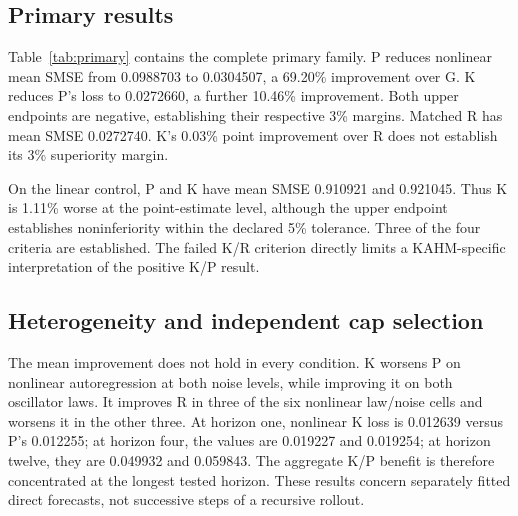 \subsection{Primary results}
Table~\ref{tab:primary} contains the complete primary family. P reduces nonlinear mean SMSE from 0.0988703 to 0.0304507, a 69.20\% improvement over G. K reduces P's loss to 0.0272660, a further 10.46\% improvement. Both upper endpoints are negative, establishing their respective 3\% margins. Matched R has mean SMSE 0.0272740. K's 0.03\% point improvement over R does not establish its 3\% superiority margin.

On the linear control, P and K have mean SMSE 0.910921 and 0.921045. Thus K is 1.11\% worse at the point-estimate level, although the upper endpoint establishes noninferiority within the declared 5\% tolerance. Three of the four criteria are established. The failed K/R criterion directly limits a KAHM-specific interpretation of the positive K/P result.

\begin{table}[t]
\centering\small
\caption{All primary comparisons at the P-selected shared bank. Gain is a percentage reduction in mean loss; negative gain denotes higher candidate loss. The difference $\bar d$ and its Bonferroni-adjusted one-sided upper endpoint use absolute SMSE units. ``Sup.'' denotes the 3\% superiority margin and ``NI'' the 5\% noninferiority margin. A criterion is met only when its upper endpoint is negative.}
\label{tab:primary}

\end{table}

\begin{table}[t]
\centering\small
\caption{Mean SMSE and standard deviation across 32 repetition aggregates. ``Shared'' uses the P-selected bank for every arm. Independent cap selection is a secondary procedure. Standard deviations describe repetition variability and are not confidence intervals.}
\label{tab:aggregate}

\end{table}

\subsection{Heterogeneity and independent cap selection}
The mean improvement does not hold in every condition. K worsens P on nonlinear autoregression at both noise levels, while improving it on both oscillator laws. It improves R in three of the six nonlinear law/noise cells and worsens it in the other three. At horizon one, nonlinear K loss is 0.012639 versus P's 0.012255; at horizon four, the values are 0.019227 and 0.019254; at horizon twelve, they are 0.049932 and 0.059843. The aggregate K/P benefit is therefore concentrated at the longest tested horizon. These results concern separately fitted direct forecasts, not successive steps of a recursive rollout.

